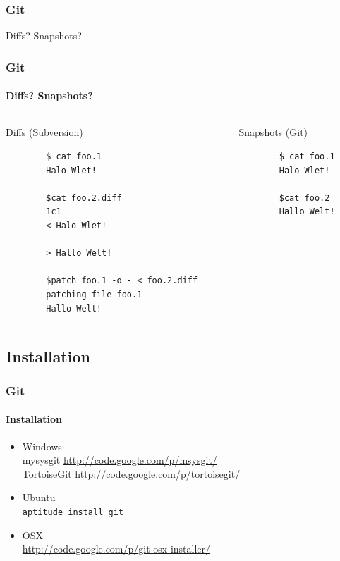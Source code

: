 \documentclass[]{beamer}
\begin{document}
\begin{frame}
	\frametitle{Git}
	\Huge{Diffs? Snapshots?}
\end{frame}

\begin{frame}[fragile]
	\frametitle{Git}
	\framesubtitle{Diffs? Snapshots?}
	\begin{columns}[T]
		\begin{column}{4.5cm}
		\huge{Diffs} \normalsize (Subversion)

		\begin{verbatim}
		$ cat foo.1
		Halo Wlet!

		$cat foo.2.diff
		1c1
		< Halo Wlet!
		---
		> Hallo Welt!

		$patch foo.1 -o - < foo.2.diff
		patching file foo.1
		Hallo Welt!
		\end{verbatim}
		\end{column}

		\begin{column}{4.5cm}
		\huge{Snapshots} \normalsize (Git)

		\begin{verbatim}
		$ cat foo.1
		Halo Wlet!

		$cat foo.2
		Hallo Welt!
		\end{verbatim}
		\end{column}
	\end{columns}
\end{frame}

\subsection{Installation}
\begin{frame}[fragile]
	\frametitle{Git}
	\framesubtitle{Installation}
	\begin{itemize}
		\item
			Windows\\
			mysysgit \url{http://code.google.com/p/msysgit/}\\
			TortoiseGit \url{http://code.google.com/p/tortoisegit/}
		\item
			Ubuntu\\
			\verb|aptitude install git|
		\item
			OSX\\
			\url{http://code.google.com/p/git-osx-installer/}
	\end{itemize}
\end{frame}
\end{document}

